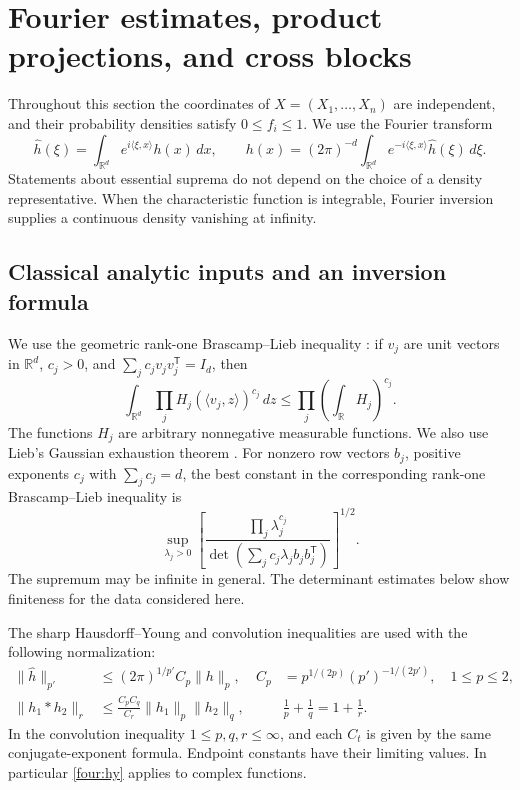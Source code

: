 \section{Fourier estimates, product projections, and cross blocks}
\label{sec:fourier}

Throughout this section the coordinates of \(X=(X_1,\ldots,X_n)\) are
independent, and their probability densities satisfy \(0\leq f_i\leq1\).
We use the Fourier transform
\[
 \widehat h(\xi)=\int_{\mathbb R^d}e^{i\langle \xi,x\rangle}h(x)\,dx,
 \qquad
 h(x)=(2\pi)^{-d}\int_{\mathbb R^d}
                 e^{-i\langle \xi,x\rangle}\widehat h(\xi)\,d\xi.
\]
Statements about essential suprema do not depend on the choice of a
density representative.  When the characteristic function is integrable,
Fourier inversion supplies a continuous density vanishing at infinity.

\subsection{Classical analytic inputs and an inversion formula}

We use the geometric rank-one Brascamp--Lieb inequality
\citep{BL1976,LPP2016}: if \(v_j\) are unit vectors in \(\mathbb R^d\),
\(c_j>0\), and \(\sum_jc_jv_jv_j^{\mathsf T}=I_d\), then
\begin{equation}\label{four:geometric-bl}
 \int_{\mathbb R^d}\prod_jH_j(\langle v_j,z\rangle)^{c_j}\,dz
 \leq\prod_j\left(\int_{\mathbb R}H_j\right)^{c_j}.
\end{equation}
The functions \(H_j\) are arbitrary nonnegative measurable functions.
We also use Lieb's Gaussian exhaustion theorem \citep{Lieb1990}.
For nonzero row vectors \(b_j\), positive exponents \(c_j\) with
\(\sum_jc_j=d\), the best constant in the corresponding rank-one
Brascamp--Lieb inequality is
\begin{equation}\label{four:gaussian-bl}
 \sup_{\lambda_j>0}
 \left[
 \frac{\prod_j\lambda_j^{c_j}}
      {\det\left(\sum_jc_j\lambda_jb_jb_j^{\mathsf T}\right)}
 \right]^{1/2}.
\end{equation}
The supremum may be infinite in general.  The determinant estimates
below show finiteness for the data considered here.

The sharp Hausdorff--Young and convolution inequalities
\citep{Beckner1975} are used with the following normalization:
\begin{align}
 \|\widehat h\|_{p'}&\leq
 (2\pi)^{1/p'}C_p\|h\|_p,
 &C_p&=p^{1/(2p)}(p')^{-1/(2p')},\quad 1\leq p\leq2,
 \label{four:hy}\\
 \|h_1*h_2\|_r&\leq\frac{C_pC_q}{C_r}
                     \|h_1\|_p\|h_2\|_q,
 &&\frac1p+\frac1q=1+\frac1r .
 \label{four:young}
\end{align}
In the convolution inequality \(1\leq p,q,r\leq\infty\), and
each \(C_t\) is given by the same conjugate-exponent formula.
Endpoint constants have their limiting values.  In particular
\eqref{four:hy} applies to complex functions.

